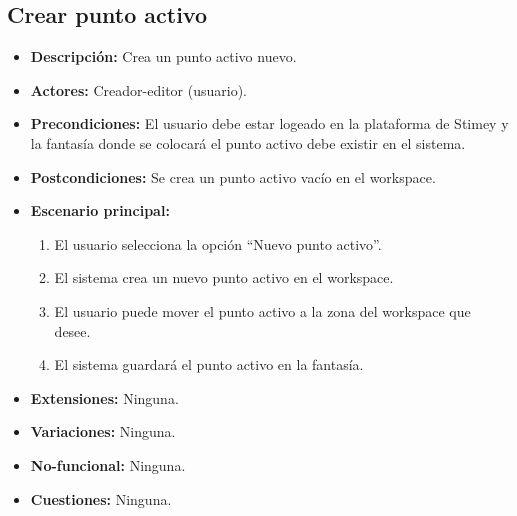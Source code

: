 \documentclass[12pt,letterpaper]{article}
\begin{document}
\subsection{Crear punto activo}
\begin{itemize}
	\item \textbf{Descripción:} Crea un punto activo nuevo.
	\item \textbf{Actores:} Creador-editor (usuario).
	\item \textbf{Precondiciones:} El usuario debe estar logeado en la plataforma de Stimey y la fantasía donde se colocará el punto activo debe existir en el sistema.
	\item \textbf{Postcondiciones:} Se crea un punto activo vacío en el workspace.
	\item \textbf{Escenario principal:}
	\begin{enumerate}
		\item El usuario selecciona la opción ``Nuevo punto activo''.
		\item El sistema crea un nuevo punto activo en el workspace.
		\item El usuario puede mover el punto activo a la zona del workspace que desee.
		\item El sistema guardará el punto activo en la fantasía.
	\end{enumerate}
	\item \textbf{Extensiones:} Ninguna.
	\item \textbf{Variaciones:} Ninguna.
	\item \textbf{No-funcional:} Ninguna.
	\item \textbf{Cuestiones:} Ninguna.
\end{itemize}
\end{document}
